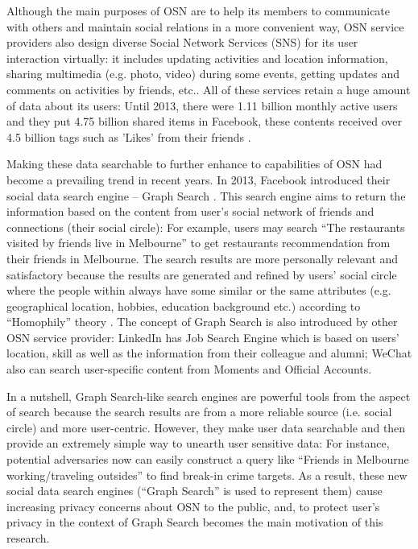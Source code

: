 Although the main purposes of OSN are to help its members to communicate with others and maintain social relations in a more convenient way, OSN service providers also design diverse Social Network Services (SNS) for its user interaction virtually: it includes updating activities and location information, sharing multimedia (e.g. photo, video) during some events, getting updates and comments on activities by friends, etc.. All of these services retain a huge amount of data about its users: Until 2013, there were 1.11 billion monthly active users and they put 4.75 billion shared items in Facebook, these contents received over 4.5 billion tags such as 'Likes' from their friends \cite{facebook2013growth}. 

Making these data searchable to further enhance to capabilities of OSN had become a prevailing trend in recent years. In 2013, Facebook introduced their social data search engine -- Graph Search \cite{facebook2013graph}. This search engine aims to return the information based on the content from user's social network of friends and connections (their social circle): For example, users may search ``The restaurants visited by friends live in Melbourne'' to get restaurants recommendation from their friends in Melbourne. The search results are more personally relevant and satisfactory because the results are generated and refined by users' social circle where the people within always have some similar or the same attributes (e.g. geographical location, hobbies, education background etc.) according to ``Homophily'' theory \cite{mcpherson2001birds}. The concept of Graph Search is also introduced by other OSN service provider: LinkedIn has Job Search Engine which is based on users' location, skill as well as the information from their colleague and alumni; WeChat also can search user-specific content from Moments and Official Accounts. 

In a nutshell, Graph Search-like search engines are powerful tools from the aspect of search because the search results are from a more reliable source (i.e. social circle) and more user-centric. However, they make user data searchable and then provide an extremely simple way to unearth user sensitive data: For instance, potential adversaries now can easily construct a query like ``Friends in Melbourne working/traveling outsides'' to find break-in crime targets. As a result, these new social data search engines (``Graph Search'' is used to represent them) cause increasing privacy concerns about OSN to the public, and, to protect user's privacy in the context of Graph Search becomes the main motivation of this research.


